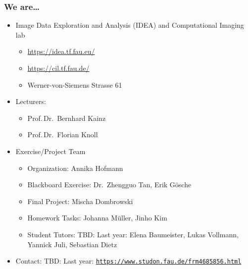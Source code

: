 

\subtitle{Motivation}




\nocite{*}

\frame[plain,c]{\titlepage} %

\begin{frame}
	\frametitle{We are\ldots}
	\begin{itemize}
		\setlength\itemsep{0.3cm}
		\item Image Data Exploration and Analysis (IDEA) and Computational Imaging lab
		\begin{itemize}
			\item \url{https://idea.tf.fau.eu/}
			\item \url{https://cil.tf.fau.de/}
			\item Werner-von-Siemens Strasse 61
		\end{itemize}
		\item Lecturers:
		\begin{itemize}
			\item Prof.\,Dr.\ Bernhard Kainz
			\item Prof.\,Dr.\ Florian Knoll
		\end{itemize}
		\item Exercise/Project Team
		\begin{itemize}
			\item Organization: \tabto{3cm} Annika Hofmann
			\item Blackboard Exercise: \tabto{3cm} Dr.\ Zhengguo Tan, Erik G\"osche
			\item Final Project: \tabto{3cm} Mischa Dombrowski
			\item Homework Tasks: \tabto{3cm} Johanna M\"uller, Jinho Kim
			\item Student Tutors: \tabto{3cm} TBD: Last year: Elena Baumeister, Lukas Vollmann, Yannick Juli, Sebastian Dietz
		\end{itemize}
		\item Contact: TBD: Last year: \texttt{\url{https://www.studon.fau.de/frm4685856.html}}
	\end{itemize}
\end{frame}

